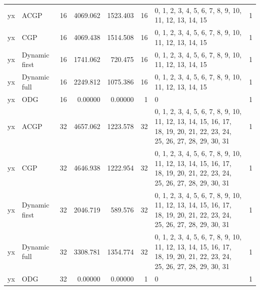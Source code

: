 \documentclass[10pt,a4paper]{article}
\begin{document}
\begin{longtable}{@{}p{23mm}p{29mm}rrrrp{36mm}r@{}}
yx & ACGP & 16 & 4069.062 & 1523.403 & 16 & 0, 1, 2, 3, 4, 5, 6, 7, 8, 9, 10, 11, 12, 13, 14, 15 & 1 \\
yx & CGP & 16 & 4069.438 & 1514.508 & 16 & 0, 1, 2, 3, 4, 5, 6, 7, 8, 9, 10, 11, 12, 13, 14, 15 & 1 \\
yx & Dynamic first & 16 & 1741.062 & 720.475 & 16 & 0, 1, 2, 3, 4, 5, 6, 7, 8, 9, 10, 11, 12, 13, 14, 15 & 1 \\
yx & Dynamic full & 16 & 2249.812 & 1075.386 & 16 & 0, 1, 2, 3, 4, 5, 6, 7, 8, 9, 10, 11, 12, 13, 14, 15 & 1 \\
yx & ODG & 16 & 0.00000 & 0.00000 & 1 & 0 & 1 \\
yx & ACGP & 32 & 4657.062 & 1223.578 & 32 & 0, 1, 2, 3, 4, 5, 6, 7, 8, 9, 10, 11, 12, 13, 14, 15, 16, 17, 18, 19, 20, 21, 22, 23, 24, 25, 26, 27, 28, 29, 30, 31 & 1 \\
yx & CGP & 32 & 4646.938 & 1222.954 & 32 & 0, 1, 2, 3, 4, 5, 6, 7, 8, 9, 10, 11, 12, 13, 14, 15, 16, 17, 18, 19, 20, 21, 22, 23, 24, 25, 26, 27, 28, 29, 30, 31 & 1 \\
yx & Dynamic first & 32 & 2046.719 & 589.576 & 32 & 0, 1, 2, 3, 4, 5, 6, 7, 8, 9, 10, 11, 12, 13, 14, 15, 16, 17, 18, 19, 20, 21, 22, 23, 24, 25, 26, 27, 28, 29, 30, 31 & 1 \\
yx & Dynamic full & 32 & 3308.781 & 1354.774 & 32 & 0, 1, 2, 3, 4, 5, 6, 7, 8, 9, 10, 11, 12, 13, 14, 15, 16, 17, 18, 19, 20, 21, 22, 23, 24, 25, 26, 27, 28, 29, 30, 31 & 1 \\
yx & ODG & 32 & 0.00000 & 0.00000 & 1 & 0 & 1 \\
\end{longtable}\normalsize\setlength{\tabcolsep}{6pt}
\clearpage
\end{document}
